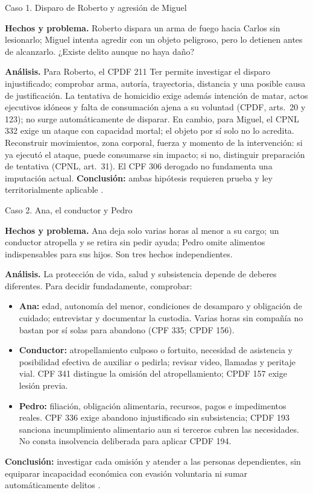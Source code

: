 \documentclass[spanish,letterpaper,oneside]{article}
\newcommand{\fichacaso}[1]{%
  \begin{tcolorbox}[colback=white,colframe=casoverde!25,
    boxrule=0.4pt,arc=0.6mm,left=1.6mm,right=1.6mm,top=1mm,bottom=1mm,
    before skip=0pt,after skip=3pt]
    #1
  \end{tcolorbox}%
}
\begin{document}
\clearpage
{}
\begin{casoestudio}{Caso 1. Disparo de Roberto y agresión de Miguel}
\fichacaso{\textbf{Hechos y problema.} Roberto dispara un arma de fuego hacia Carlos sin lesionarlo; Miguel intenta agredir con un objeto peligroso, pero lo detienen antes de alcanzarlo. ¿Existe delito aunque no haya daño?}
\textbf{Análisis.} Para Roberto, el CPDF 211 Ter permite investigar el disparo injustificado; comprobar arma, autoría, trayectoria, distancia y una posible causa de justificación. La tentativa de homicidio exige además intención de matar, actos ejecutivos idóneos y falta de consumación ajena a su voluntad (CPDF, arts.~20 y 123); no surge automáticamente de disparar. En cambio, para Miguel, el CPNL 332 exige un ataque con capacidad mortal; el objeto por sí solo no lo acredita. Reconstruir movimientos, zona corporal, fuerza y momento de la intervención: si ya ejecutó el ataque, puede consumarse sin impacto; si no, distinguir preparación de tentativa (CPNL, art.~31). El CPF 306 derogado no fundamenta una imputación actual. \textbf{Conclusión:} ambas hipótesis requieren prueba y ley territorialmente aplicable \citep{cpdfS4Vigente,cpnlS4Vigente,cpfS4Vigente}.
\end{casoestudio}

\begin{casoestudio}{Caso 2. Ana, el conductor y Pedro}
\fichacaso{\textbf{Hechos y problema.} Ana deja solo varias horas al menor a su cargo; un conductor atropella y se retira sin pedir ayuda; Pedro omite alimentos indispensables para sus hijos. Son tres hechos independientes.}
\textbf{Análisis.} La protección de vida, salud y subsistencia depende de deberes diferentes. Para decidir fundadamente, comprobar:
\begin{itemize}[leftmargin=*,topsep=1pt,itemsep=1pt,parsep=0pt]
\item \textbf{Ana:} edad, autonomía del menor, condiciones de desamparo y obligación de cuidado; entrevistar y documentar la custodia. Varias horas sin compañía no bastan por sí solas para abandono (CPF 335; CPDF 156).
\item \textbf{Conductor:} atropellamiento culposo o fortuito, necesidad de asistencia y posibilidad efectiva de auxiliar o pedirla; revisar video, llamadas y peritaje vial. CPF 341 distingue la omisión del atropellamiento; CPDF 157 exige lesión previa.
\item \textbf{Pedro:} filiación, obligación alimentaria, recursos, pagos e impedimentos reales. CPF 336 exige abandono injustificado sin subsistencia; CPDF 193 sanciona incumplimiento alimentario aun si terceros cubren las necesidades. No consta insolvencia deliberada para aplicar CPDF 194.
\end{itemize}
\textbf{Conclusión:} investigar cada omisión y atender a las personas dependientes, sin equiparar incapacidad económica con evasión voluntaria ni sumar automáticamente delitos \citep{cpfS4Vigente,cpdfS4Vigente}.
\end{casoestudio}
\end{document}

